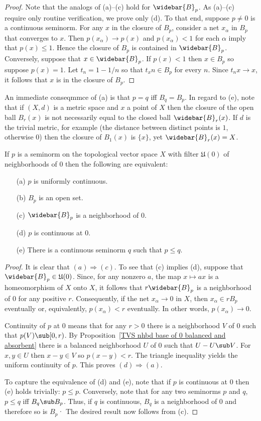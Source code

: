 \begin{proof}
Note that the analogs of (a)--(c) hold for $\widebar{B}_p$. As (a)--(c) require only routine verification, we prove only (d). To that end, suppose $p\neq 0$ is a continuous seminorm. For any $x$ in the closure of $B_p$, consider a net $x_\alpha$ in $B_p$ that converges to $x$. Then $p(x_\alpha)\to p(x)$ and $p(x_\alpha)<1$ for each $\alpha$ imply that $p(x)\leq 1$. Hence the closure of $B_p$ is contained in $\widebar{B}_p$. Conversely, suppose that $x\in\widebar{B}_p$. If $p(x)<1$ then $x\in B_p$ so suppose $p(x)=1$. Let $t_n=1-1/n$ so that $t_xn\in B_p$ for every $n$. Since $t_nx\to x$, it follows that $x$ is in the closure of $B_p$.
\end{proof}
An immediate conseqmmce of (a) is that $p=q$ iff $B_q=B_p$. In regard to (e), note that if $(X,d)$ is a metric space and $x$ a point of $X$ then the closure of the open ball $B_r(x)$ is not necessarily equal to the closed ball $\widebar{B}_r(x)$. If $d$ is the trivial metric, for example (the distance between distinct points is $1$, otherwise $0$) then the closure of $B_1(x)$ is $\{x\}$, yet $\widebar{B}_r(x)=X$.
\begin{proposition}\label{seminorm continuous iff}
If $p$ is a seminorm on the topological vector space $X$ with filter $\mathfrak{U}(0)$ of neighborhoods of $0$ then the following are equivalent:
\begin{itemize}
\item[(a)] $p$ is uniformly continuous.
\item[(b)] $B_p$ is an open set.
\item[(c)] $\widebar{B}_p$ is a neighborhood of $0$.
\item[(d)] $p$ is continuous at $0$.
\item[(e)] There is a continuous seminorm $q$ such that $p\leq q$.
\end{itemize}
\end{proposition}
\begin{proof}
It is clear that $(a)\Rightarrow(c)$. To see that (c) implies (d), suppose that $\widebar{B}_p\in\mathfrak{U}(0)$. Since, for any nonzero $a$, the map $x\mapsto ax$ is a homeomorphism of $X$ onto $X$, it follows that $r\widebar{B}_p$ is a neighborhood of $0$ for any positive $r$. Consequently, if the net $x_\alpha\to 0$ in $X$, then $x_\alpha\in rB_p$ eventually or, equivalently, $p(x_\alpha)<r$ eventually. In other words, $p(x_\alpha)\to 0$.\par
Continuity of $p$ at $0$ means that for any $r>0$ there is a neighborhood $V$ of $0$ such that $p(V)\sub[0,r)$. By Proposition~\ref{TVS nhbd base of 0 balanced and absorbent} there is a balanced neighborhood $U$ of $0$ such that $U-U\sub V$. For $x,y\in U$ then $x-y\in V$ so $p(x-y)<r$. The triangle inequality yields the uniform continuity of $p$. This proves $(d)\Rightarrow(a)$.\par
To capture the equivalence of (d) and (e), note that if $p$ is continuous at $0$ then (e) holds trivially: $p\leq p$. Conversely, note that for any two seminorms $p$ and $q$, $p\leq q$ iff $B_q\sub B_p$. Thus, if $q$ is continuous, $B_q$ is a neighborhood of $0$ and therefore so is $B_p$· The desired result now follows from (c).
\end{proof}

